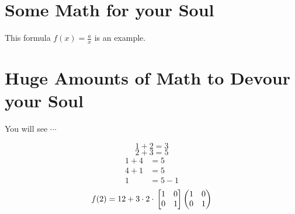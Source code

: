 \documentclass{article}
\begin{document}
\section{Some Math for your Soul}
This formula $f(x) = \frac{a}{x}$ is an example.
\section{Huge Amounts of Math to Devour your Soul}
You will see $\cdots$

\begin{equation*}
	1 + 2 = 3
\end{equation*}
\begin{equation*}
	2 + 3 = 5
\end{equation*}
\begin{align*}
	1 + 4 &= 5\\
	4 + 1 &= 5\\
	1 &= 5 - 1
\end{align*}
\begin{equation}
	f(2) = 12 + 3  \cdot 2 \cdot \\
	\left[
	\begin{matrix}
		1 & 0\\
		0 & 1
	\end{matrix}
	\right]
	\left(
	\begin{matrix}
		1 & 0\\
		0 & 1
	\end{matrix}
	\right)
\end{equation}
\end{document}
